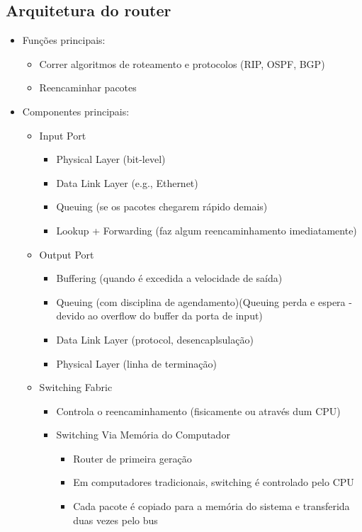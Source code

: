 \documentclass{article}
\begin{document}
\subsection{Arquitetura do router}
\begin{itemize}
    \item Funções principais:
    \begin{itemize}
        \item Correr algoritmos de roteamento e protocolos (RIP, OSPF, BGP)
		\item Reencaminhar pacotes
    \end{itemize}
    \item Componentes principais:
    \begin{itemize}
        \item Input Port
        \begin{itemize}
            \item Physical Layer (bit-level)
			\item Data Link Layer (e.g., Ethernet)
			\item Queuing (se os pacotes chegarem rápido demais)
			\item Lookup + Forwarding (faz algum reencaminhamento imediatamente)
        \end{itemize}
        \item Output Port
        \begin{itemize}
            \item Buffering (quando é excedida a velocidade de saída)
			\item Queuing (com disciplina de agendamento)(Queuing perda e espera - devido ao overflow do buffer da porta de input)
			\item Data Link Layer (protocol, desencaplsulação)
			\item Physical Layer (linha de terminação)
        \end{itemize}
        \item Switching Fabric
        \begin{itemize}
            \item Controla o reencaminhamento (fisicamente ou através dum CPU)
            \item Switching Via Memória do Computador
            \begin{itemize}
                \item Router de primeira geração
                \item Em computadores tradicionais, switching é controlado pelo CPU
                \item Cada pacote é copiado para a memória do sistema e transferida duas vezes pelo bus

\end{itemize}
\end{itemize}
\end{itemize}
\end{itemize}
\end{document}
